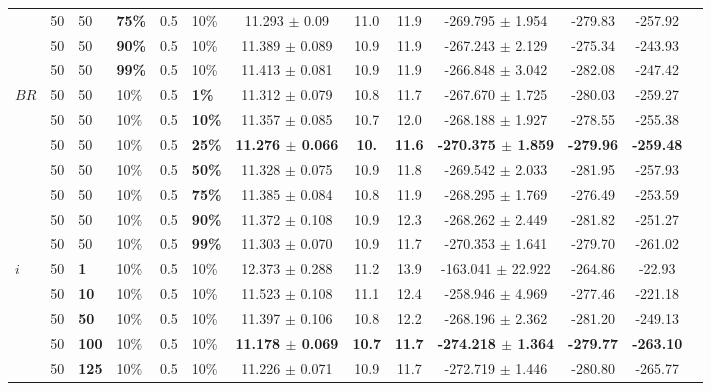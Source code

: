\begin{sidewaystable}
\begin{tabular}{|l|l|l|l|l|l||c|c|c|c|c|c|c|}
    ~ & 50 & 50 & \textbf{75\%} & 0.5 & 10\% & 11.293 $\pm$ 0.09 & 11.0 & 11.9 & -269.795 $\pm$ 1.954 & -279.83 & -257.92 \\
    ~ & 50 & 50 & \textbf{90\%} & 0.5 & 10\% & 11.389 $\pm$ 0.089 & 10.9 & 11.9 & -267.243 $\pm$ 2.129 & -275.34 & -243.93 \\
    ~ & 50 & 50 & \textbf{99\%} & 0.5 & 10\% & 11.413 $\pm$ 0.081 & 10.9 & 11.9 & -266.848 $\pm$ 3.042 & -282.08 & -247.42  \\
    \hline
    $BR$ & 50 & 50 & 10\% & 0.5 & \textbf{1\%} & 11.312 $\pm$ 0.079 & 10.8 & 11.7 & -267.670 $\pm$ 1.725 & -280.03 & -259.27 \\
    ~    & 50 & 50 & 10\% & 0.5 & \textbf{10\%} & 11.357 $\pm$ 0.085 & 10.7 & 12.0 & -268.188 $\pm$ 1.927 & -278.55 & -255.38 \\
    ~    & 50 & 50 & 10\% & 0.5 & \textbf{25\%} & \textbf{11.276 $\pm$ 0.066} & \textbf{10.} & \textbf{11.6} & \textbf{-270.375 $\pm$ 1.859} & \textbf{-279.96} & \textbf{-259.48} \\
    ~    & 50 & 50 & 10\% & 0.5 & \textbf{50\%} & 11.328 $\pm$ 0.075 & 10.9 & 11.8 & -269.542 $\pm$ 2.033 & -281.95 & -257.93 \\
    ~    & 50 & 50 & 10\% & 0.5 & \textbf{75\%} & 11.385 $\pm$ 0.084 & 10.8 & 11.9 & -268.295 $\pm$ 1.769 & -276.49 & -253.59 \\
    ~    & 50 & 50 & 10\% & 0.5 & \textbf{90\%} & 11.372 $\pm$ 0.108 & 10.9 & 12.3 & -268.262 $\pm$ 2.449 & -281.82 & -251.27 \\
    ~    & 50 & 50 & 10\% & 0.5 & \textbf{99\%} & 11.303 $\pm$ 0.070 & 10.9 & 11.7 & -270.353 $\pm$ 1.641 & -279.70 & -261.02  \\
    \hline
    $i$ & 50 & \textbf{1} & 10\% & 0.5 & 10\% & 12.373 $\pm$ 0.288 & 11.2 & 13.9& -163.041 $\pm$ 22.922 & -264.86 & -22.93  \\
    ~   & 50 &\textbf{10} & 10\% & 0.5 & 10\% & 11.523 $\pm$ 0.108 & 11.1 & 12.4 & -258.946 $\pm$ 4.969 & -277.46& -221.18 \\
    ~   & 50 &\textbf{50} & 10\% & 0.5 & 10\% & 11.397 $\pm$ 0.106 & 10.8 & 12.2 & -268.196 $\pm$ 2.362 & -281.20 & -249.13 \\
    ~   & 50 &\textbf{100} & 10\% & 0.5 & 10\% & \textbf{11.178 $\pm$ 0.069} & \textbf{10.7} & \textbf{11.7} & \textbf{-274.218 $\pm$ 1.364} & \textbf{-279.77} & \textbf{-263.10} \\
    ~   & 50 &\textbf{125} & 10\% & 0.5 & 10\% & 11.226 $\pm$ 0.071 & 10.9 & 11.7 & -272.719 $\pm$ 1.446 & -280.80 & -265.77  \\

\end{tabular}
\end{sidewaystable}
